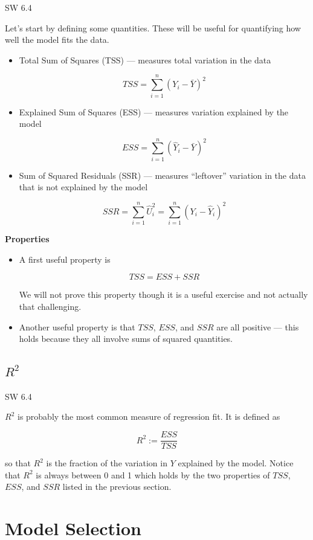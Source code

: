 \documentclass[
  letterpaper,
  DIV=11,
  numbers=noendperiod]{scrreprt}
\begin{document}
SW 6.4

Let's start by defining some quantities. These will be useful for
quantifying how well the model fits the data.

\begin{itemize}
\item
  Total Sum of Squares (TSS) --- measures total variation in the data

  \[
      TSS = \sum_{i=1}^n (Y_i - \bar{Y})^2
    \]
\item
  Explained Sum of Squares (ESS) --- measures variation explained by the
  model

  \[
      ESS = \sum_{i=1}^n (\hat{Y}_i - \bar{Y})^2
    \]
\item
  Sum of Squared Residuals (SSR) --- measures ``leftover'' variation in
  the data that is not explained by the model

  \[
      SSR = \sum_{i=1}^n \hat{U}_i^2 = \sum_{i=1}^n (Y_i - \hat{Y}_i)^2
    \]
\end{itemize}

\textbf{Properties}

\begin{itemize}
\item
  A first useful property is

  \[
      TSS = ESS + SSR
    \]

  We will not prove this property though it is a useful exercise and not
  actually that challenging.
\item
  Another useful property is that \(TSS\), \(ESS\), and \(SSR\) are all
  positive --- this holds because they all involve sums of squared
  quantities.
\end{itemize}

\subsection{\texorpdfstring{\(R^2\)}{R\^{}2}}\label{r2}

SW 6.4

\(R^2\) is probably the most common measure of regression fit. It is
defined as

\[
  R^2 := \frac{ESS}{TSS}
\]

so that \(R^2\) is the fraction of the variation in \(Y\) explained by
the model. Notice that \(R^2\) is always between 0 and 1 which holds by
the two properties of \(TSS\), \(ESS\), and \(SSR\) listed in the
previous section.

\section{Model Selection}\label{model-selection}
\end{document}
